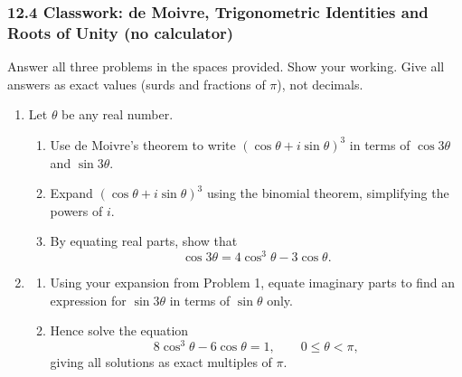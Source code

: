 \documentclass[12pt, twoside]{article}
\begin{document}
\subsubsection*{12.4 Classwork: de Moivre, Trigonometric Identities and Roots of Unity (no calculator)}

Answer all three problems in the spaces provided. Show your working. Give all
answers as exact values (surds and fractions of $\pi$), not decimals.

\begin{enumerate}[itemsep=0.15cm]

\item[1.]

Let $\theta$ be any real number.

\begin{enumerate}[itemsep=0.15cm]
  \item Use de Moivre's theorem to write $(\cos\theta + i\sin\theta)^{3}$ in
  terms of $\cos 3\theta$ and $\sin 3\theta$.
  \item Expand $(\cos\theta + i\sin\theta)^{3}$ using the binomial theorem,
  simplifying the powers of $i$.
  \item By equating real parts, show that
  $$\cos 3\theta = 4\cos^{3}\theta - 3\cos\theta.$$
\end{enumerate}


\newpage

\item[2.]

\begin{enumerate}[itemsep=0.15cm]
  \item Using your expansion from Problem 1, equate imaginary parts to find an
  expression for $\sin 3\theta$ in terms of $\sin\theta$ only.
  \item Hence solve the equation
  $$8\cos^{3}\theta - 6\cos\theta = 1, \qquad 0 \leq \theta < \pi,$$
  giving all solutions as exact multiples of $\pi$.
\end{enumerate}


\end{enumerate}
\end{document}

